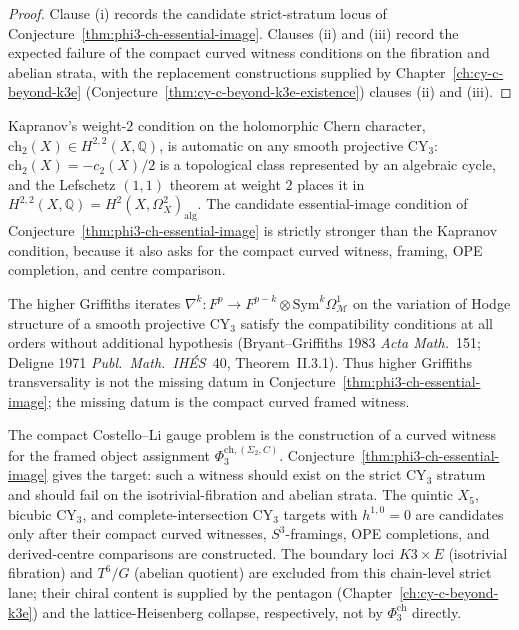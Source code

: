 \begin{proof}
Clause (i) records the candidate strict-stratum locus of Conjecture~\ref{thm:phi3-ch-essential-image}. Clauses (ii) and (iii) record the expected failure of the compact curved witness conditions on the fibration and abelian strata, with the replacement constructions supplied by Chapter~\ref{ch:cy-c-beyond-k3e} (Conjecture~\ref{thm:cy-c-beyond-k3e-existence}) clauses (ii) and (iii).
\end{proof}

\begin{remark}
\label{rem:kapranov-weight-2-vacuous-phi3-ch}
Kapranov's weight-$2$ condition on the holomorphic Chern character, $\mathrm{ch}_2(X) \in H^{2,2}(X, \mathbb{Q})$, is automatic on any smooth projective CY$_3$: $\mathrm{ch}_2(X) = -c_2(X)/2$ is a topological class represented by an algebraic cycle, and the Lefschetz $(1,1)$ theorem at weight $2$ places it in $H^{2,2}(X, \mathbb{Q}) = H^2(X, \Omega^2_X)_{\mathrm{alg}}$. The candidate essential-image condition of Conjecture~\ref{thm:phi3-ch-essential-image} is strictly stronger than the Kapranov condition, because it also asks for the compact curved witness, framing, OPE completion, and centre comparison.
\end{remark}

\begin{remark}
\label{rem:higher-griffiths-automatic-phi3-ch}
The higher Griffiths iterates $\nabla^k \colon F^p \to F^{p-k} \otimes \mathrm{Sym}^k \Omega^1_{\mathcal{M}}$ on the variation of Hodge structure of a smooth projective CY$_3$ satisfy the compatibility conditions at all orders without additional hypothesis (Bryant--Griffiths 1983 \textit{Acta Math.}~151; Deligne 1971 \textit{Publ.~Math.~IH\'ES}~40, Theorem~II.3.1). Thus higher Griffiths transversality is not the missing datum in Conjecture~\ref{thm:phi3-ch-essential-image}; the missing datum is the compact curved framed witness.
\end{remark}

\begin{remark}
\label{rem:strict-compact-locus-density}
The compact Costello--Li gauge problem is the construction of a curved
witness for the framed object assignment $\Phi_3^{\mathrm{ch},(\Sigma_2,C)}$.
Conjecture~\ref{thm:phi3-ch-essential-image} gives the target: such a
witness should exist on the strict CY$_3$ stratum and should fail on the
isotrivial-fibration and abelian strata. The quintic $X_5$, bicubic
CY$_3$, and complete-intersection CY$_3$ targets with $h^{1,0} = 0$ are
candidates only after their compact curved witnesses, $S^3$-framings,
OPE completions, and derived-centre comparisons are constructed. The
boundary loci $K3 \times E$ (isotrivial fibration) and $T^6 / G$
(abelian quotient) are excluded from this chain-level strict lane; their
chiral content is supplied by the pentagon
(Chapter~\ref{ch:cy-c-beyond-k3e}) and the lattice-Heisenberg collapse,
respectively, not by $\Phi_3^{\mathrm{ch}}$ directly.
\end{remark}

